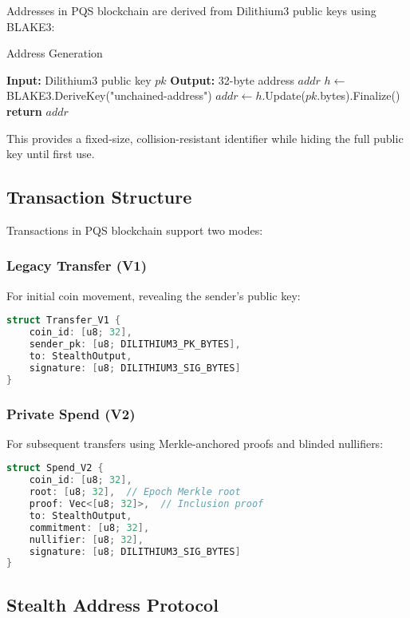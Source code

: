 \documentclass[12pt,a4paper]{article}
\begin{document}
Addresses in PQS blockchain are derived from Dilithium3 public keys using BLAKE3:

\begin{algorithm}
\caption{Address Generation}
\begin{algorithmic}
\STATE \textbf{Input:} Dilithium3 public key $pk$
\STATE \textbf{Output:} 32-byte address $addr$
\STATE $h \leftarrow$ BLAKE3.DeriveKey("unchained-address")
\STATE $addr \leftarrow h$.Update($pk$.bytes).Finalize()
\STATE \textbf{return} $addr$
\end{algorithmic}
\end{algorithm}

This provides a fixed-size, collision-resistant identifier while hiding the full public key until first use.

\subsection{Transaction Structure}

Transactions in PQS blockchain support two modes:

\subsubsection{Legacy Transfer (V1)}
For initial coin movement, revealing the sender's public key:

\begin{lstlisting}[language=C]
struct Transfer_V1 {
    coin_id: [u8; 32],
    sender_pk: [u8; DILITHIUM3_PK_BYTES],
    to: StealthOutput,
    signature: [u8; DILITHIUM3_SIG_BYTES]
}
\end{lstlisting}

\subsubsection{Private Spend (V2)}
For subsequent transfers using Merkle-anchored proofs and blinded nullifiers:

\begin{lstlisting}[language=C]
struct Spend_V2 {
    coin_id: [u8; 32],
    root: [u8; 32],  // Epoch Merkle root
    proof: Vec<[u8; 32]>,  // Inclusion proof
    to: StealthOutput,
    commitment: [u8; 32],
    nullifier: [u8; 32],
    signature: [u8; DILITHIUM3_SIG_BYTES]
}
\end{lstlisting}

\subsection{Stealth Address Protocol}
\end{document}
